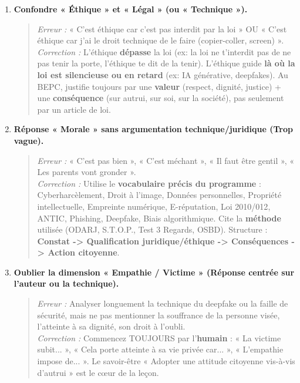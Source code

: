 \documentclass[11pt]{article}
\newcommand{\cle}[1]{{\popxbold\color{popdark}#1}}
\begin{document}
\begin{attention}
\begin{enumerate}
    \item \textbf{Confondre « Éthique » et « Légal » (ou « Technique »).}
    \begin{quote}
    \textit{Erreur :} « C'est éthique car c'est pas interdit par la loi » OU « C'est éthique car j'ai le droit technique de le faire (copier-coller, screen) ». \\
    \textit{Correction :} L'éthique \textbf{dépasse} la loi (ex: la loi ne t'interdit pas de ne pas tenir la porte, l'éthique te dit de la tenir). L'éthique guide \textbf{là où la loi est silencieuse ou en retard} (ex: IA générative, deepfakes). Au BEPC, justifie toujours par une \textbf{valeur} (respect, dignité, justice) + une \textbf{conséquence} (sur autrui, sur soi, sur la société), pas seulement par un article de loi.
    \end{quote}
    \item \textbf{Réponse « Morale » sans argumentation technique/juridique (Trop vague).}
    \begin{quote}
    \textit{Erreur :} « C'est pas bien », « C'est méchant », « Il faut être gentil », « Les parents vont gronder ». \\
    \textit{Correction :} Utilise le \textbf{vocabulaire précis du programme} : \cle{Cyberharcèlement}, \cle{Droit à l'image}, \cle{Données personnelles}, \cle{Propriété intellectuelle}, \cle{Empreinte numérique}, \cle{E-réputation}, \cle{Loi 2010/012}, \cle{ANTIC}, \cle{Phishing}, \cle{Deepfake}, \cle{Biais algorithmique}. Cite la \textbf{méthode} utilisée (ODARJ, S.T.O.P., Test 3 Regards, OSBD). Structure : \textbf{Constat -> Qualification juridique/éthique -> Conséquences -> Action citoyenne}.
    \end{quote}
    \item \textbf{Oublier la dimension « Empathie / Victime » (Réponse centrée sur l'auteur ou la technique).}
    \begin{quote}
    \textit{Erreur :} Analyser longuement la technique du deepfake ou la faille de sécurité, mais ne pas mentionner la souffrance de la personne visée, l'atteinte à sa dignité, son droit à l'oubli. \\
    \textit{Correction :} Commencez TOUJOURS par l'\textbf{humain} : « La victime subit... », « Cela porte atteinte à sa vie privée car... », « L'empathie impose de... ». Le savoir-être « Adopter une attitude citoyenne vis-à-vis d'autrui » est le cœur de la leçon.

\end{quote}
\end{enumerate}
\end{attention}
\end{document}
